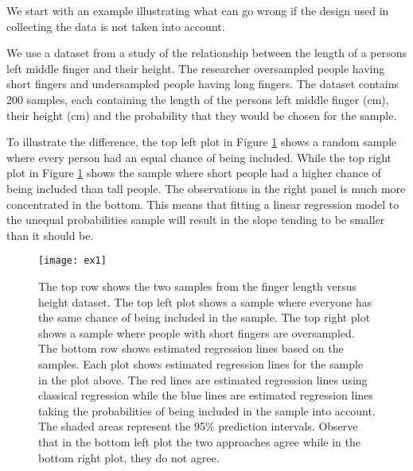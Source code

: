 \documentclass{article}
\begin{document}
We start
with an example illustrating what can go wrong if the design used in collecting
the data is not taken into account.


\begin{example} \label{ex:anthuneq}

We use a dataset from a study of the relationship between the length of a persons left middle finger and their height. 
The researcher oversampled people having short fingers and undersampled people
having long fingers.
The dataset contains 200 samples, each containing the length of the persons left middle finger (cm), their height (cm) and the probability that they would be chosen for the sample.

To illustrate the difference, the top left plot in Figure \ref{fig:ex1} shows a random sample where every
person had an equal chance of being included. While the top right plot in Figure
\ref{fig:ex1} shows the sample
where short people had a higher chance of being included than tall people. The
observations in the right panel is much more concentrated in the bottom.
This means that fitting a linear regression model to the unequal probabilities
sample will result in the slope tending to be smaller than it should be.

\begin{figure}
  \centering
  
  \texttt{[image: ex1]}

  \caption{The top row shows the two samples from the finger length versus
    height dataset. The top left plot shows a sample where everyone has the
    same chance of being included in the sample.
    The top right plot shows a sample where people with short fingers are
    oversampled. The bottom row shows estimated regression lines based on the
    samples. Each plot shows estimated
    regression lines for the sample in the plot above. The red lines are
    estimated regression lines using classical regression while the blue lines
    are estimated
    regression lines taking the probabilities of being included in the sample
    into account. The shaded areas represent the 95\% prediction intervals.
    Observe that in the bottom left plot the two approaches agree while in the
    bottom right plot, they do not agree.}

  \label{fig:ex1}
\end{figure}


\end{example}
\end{document}
